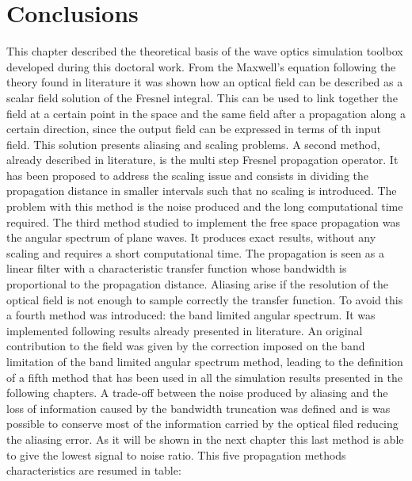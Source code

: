 \section{Conclusions}
This chapter described the theoretical basis of the wave optics simulation toolbox developed during this doctoral work.
From the Maxwell's equation following the theory found in literature it was shown how an optical field can be described as a scalar field solution of the Fresnel integral. This can be used to link together the field at a certain point in the space and the same field after a propagation along a certain direction, since the output field can be expressed in terms of th input field. This solution presents aliasing and scaling problems. A second method, already described in literature, is the multi step Fresnel propagation operator. It has been proposed to address the scaling issue and consists in dividing the propagation distance in smaller intervals such that no scaling is introduced. The problem with this method is the noise produced and the long computational time required. 
The third method studied to implement the free space propagation was the angular spectrum of plane waves. It produces exact results, without any scaling and requires a short computational time. The propagation is seen as a linear filter with a characteristic transfer function whose bandwidth is proportional to the propagation distance. Aliasing arise if the resolution of the optical field is not enough to sample correctly the transfer function. To avoid this a fourth method was introduced: the band limited angular spectrum. It was implemented following results already presented in literature. An original contribution to the field was given by the correction imposed on the band limitation of the band limited angular spectrum method, leading to the definition of a fifth method that has been used in all the simulation results presented in the following chapters. A trade-off between the noise produced by aliasing and the loss of information caused by the bandwidth truncation was defined and is was possible to conserve most of the information carried by the optical filed reducing the aliasing error. As it will be shown in the next chapter this last method is able to give the lowest signal to noise ratio.
This five propagation methods characteristics are resumed in table:
